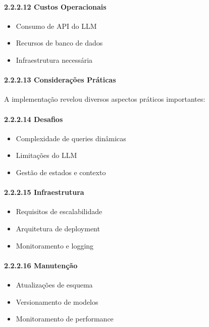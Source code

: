 \documentclass[
]{article}
\providecommand{\tightlist}{%
  \setlength{\itemsep}{0pt}\setlength{\parskip}{0pt}}
\begin{document}
\paragraph{2.2.2.12 Custos Operacionais}\label{custos-operacionais}

\begin{itemize}
\tightlist
\item
  Consumo de API do LLM
\item
  Recursos de banco de dados
\item
  Infraestrutura necessária
\end{itemize}

\paragraph{2.2.2.13 Considerações
Práticas}\label{considerauxe7uxf5es-pruxe1ticas}

A implementação revelou diversos aspectos práticos importantes:

\paragraph{2.2.2.14 Desafios}\label{desafios}

\begin{itemize}
\tightlist
\item
  Complexidade de queries dinâmicas
\item
  Limitações do LLM
\item
  Gestão de estados e contexto
\end{itemize}

\paragraph{2.2.2.15 Infraestrutura}\label{infraestrutura}

\begin{itemize}
\tightlist
\item
  Requisitos de escalabilidade
\item
  Arquitetura de deployment
\item
  Monitoramento e logging
\end{itemize}

\paragraph{2.2.2.16 Manutenção}\label{manutenuxe7uxe3o}

\begin{itemize}
\tightlist
\item
  Atualizações de esquema
\item
  Versionamento de modelos
\item
  Monitoramento de performance
\end{itemize}
\end{document}
